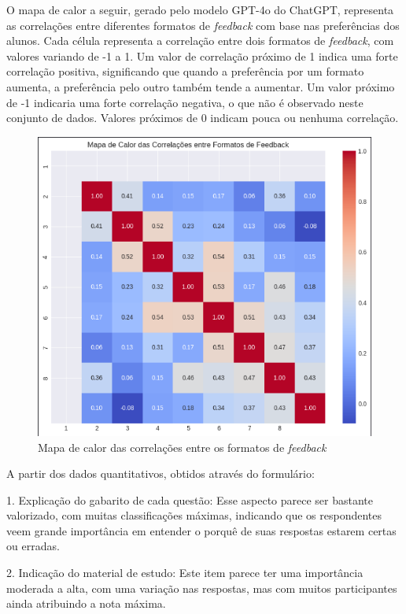 O mapa de calor a seguir, gerado pelo modelo GPT-4o do ChatGPT, representa as correlações entre diferentes formatos de \textit{feedback} com base nas preferências dos alunos. Cada célula representa a correlação entre dois formatos de \textit{feedback}, com valores variando de -1 a 1. Um valor de correlação próximo de 1 indica uma forte correlação positiva, significando que quando a preferência por um formato aumenta, a preferência pelo outro também tende a aumentar. Um valor próximo de -1 indicaria uma forte correlação negativa, o que não é observado neste conjunto de dados. Valores próximos de 0 indicam pouca ou nenhuma correlação.

\begin{figure}[H]
\centering
\caption{Mapa de calor das correlações entre os formatos de \textit{feedback}}
\includegraphics[scale=0.6]{figuras/heatmap.png}
\end{figure}

A partir dos dados quantitativos, obtidos através do formulário: 

1. Explicação do gabarito de cada questão: Esse aspecto parece ser bastante valorizado, com muitas classificações máximas, indicando que os respondentes veem grande importância em entender o porquê de suas respostas estarem certas ou erradas.

2. Indicação do material de estudo: Este item parece ter uma importância moderada a alta, com uma variação nas respostas, mas com muitos participantes ainda atribuindo a nota máxima.

